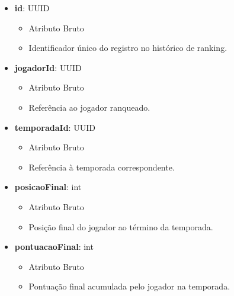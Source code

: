     \begin{itemize}
        \item \textbf{id}: UUID  
              \begin{itemize}
                  \item Atributo Bruto
                  \item Identificador único do registro no histórico de ranking.
              \end{itemize}
    
        \item \textbf{jogadorId}: UUID  
              \begin{itemize}
                  \item Atributo Bruto
                  \item Referência ao jogador ranqueado.
              \end{itemize}
    
        \item \textbf{temporadaId}: UUID  
              \begin{itemize}
                  \item Atributo Bruto
                  \item Referência à temporada correspondente.
              \end{itemize}
    
        \item \textbf{posicaoFinal}: int  
              \begin{itemize}
                  \item Atributo Bruto
                  \item Posição final do jogador ao término da temporada.
              \end{itemize}
    
        \item \textbf{pontuacaoFinal}: int  
              \begin{itemize}
                  \item Atributo Bruto
                  \item Pontuação final acumulada pelo jogador na temporada.
              \end{itemize}
    

\end{itemize}
